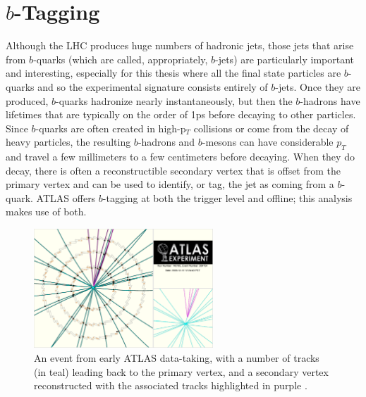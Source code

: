 \section{$b$-Tagging}
\label{sec:b-tag}

Although the LHC produces huge numbers of hadronic jets, those jets that arise from $b$-quarks
(which are called, appropriately, $b$-jets) are particularly important and interesting,
especially for this thesis where all the final state particles are $b$-quarks and so the 
experimental signature consists entirely of $b$-jets.
Once they are produced, $b$-quarks hadronize nearly instantaneously, but then
the $b$-hadrons have lifetimes that are typically on the order of 1ps before
decaying to other particles. 
Since $b$-quarks are often created in high-p$_T$ collisions or come from the decay 
of heavy particles, the resulting $b$-hadrons and $b$-mesons can have considerable $p_T$ and travel a few millimeters to a few centimeters before decaying.
When they do decay, there is often a reconstructible secondary vertex that is offset from
the primary vertex and can be used to identify, or tag, the jet as coming from a $b$-quark.  
ATLAS offers $b$-tagging at both the trigger level and offline; this analysis makes use of both.


\begin{figure}
    \center
	\includegraphics[width=0.6\textwidth]{ReconstructionPerformance/images/secondary_vertex.pdf}
	\caption{An event from early ATLAS data-taking, with a number of tracks (in teal) leading back to the primary vertex, and a secondary vertex reconstructed with the associated tracks highlighted in purple \cite{sv}.	\label{fig:secondary_vertex}  }
\end{figure}



